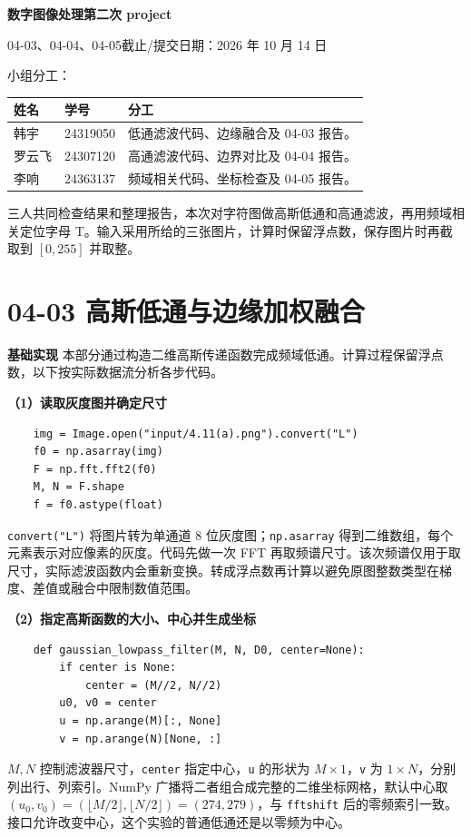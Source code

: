 \documentclass[UTF8,a4paper,zihao=5,fontset=fandol]{ctexart}
\begin{document}
\thispagestyle{plain}
\begin{center}
{\LARGE\bfseries 数字图像处理\quad 第二次 project}\par\vspace{5pt}
04-03、04-04、04-05\qquad 截止/提交日期：2026 年 10 月 14 日
\end{center}
\noindent 小组分工：
\begin{center}\small
\begin{tabularx}{\linewidth}{@{}llX@{}}\toprule
姓名 & 学号 & 分工\\\midrule
韩宇 & 24319050 & 低通滤波代码、边缘融合及 04-03 报告。\\
罗云飞 & 24307120 & 高通滤波代码、边界对比及 04-04 报告。\\
李响 & 24363137 & 频域相关代码、坐标检查及 04-05 报告。\\\bottomrule
\end{tabularx}
\end{center}
三人共同检查结果和整理报告，本次对字符图做高斯低通和高通滤波，再用频域相关定位字母 T。输入采用所给的三张图片，计算时保留浮点数，保存图片时再截取到 $[0,255]$ 并取整。

\section{04-03 高斯低通与边缘加权融合}
\textbf{基础实现}  本部分通过构造二维高斯传递函数完成频域低通。计算过程保留浮点数，以下按实际数据流分析各步代码。

\textbf{（1）读取灰度图并确定尺寸}
{\small
\begin{verbatim}
    img = Image.open("input/4.11(a).png").convert("L")
    f0 = np.asarray(img)
    F = np.fft.fft2(f0)
    M, N = F.shape
    f = f0.astype(float)
\end{verbatim}
}
\texttt{convert("L")} 将图片转为单通道 8 位灰度图；\texttt{np.asarray} 得到二维数组，每个元素表示对应像素的灰度。代码先做一次 FFT 再取频谱尺寸。该次频谱仅用于取尺寸，实际滤波函数内会重新变换。转成浮点数再计算以避免原图整数类型在梯度、差值或融合中限制数值范围。

\textbf{（2）指定高斯函数的大小、中心并生成坐标}
{\small
\begin{verbatim}
    def gaussian_lowpass_filter(M, N, D0, center=None):
        if center is None:
            center = (M//2, N//2)
        u0, v0 = center
        u = np.arange(M)[:, None]
        v = np.arange(N)[None, :]
\end{verbatim}
}
$M,N$ 控制滤波器尺寸，\texttt{center} 指定中心，\texttt{u} 的形状为 $M\times1$，\texttt{v} 为 $1\times N$，分别列出行、列索引。NumPy 广播将二者组合成完整的二维坐标网格，默认中心取 $(u_0,v_0)=(\lfloor M/2\rfloor,\lfloor N/2\rfloor)=(274,279)$，与 \texttt{fftshift} 后的零频索引一致。接口允许改变中心，这个实验的普通低通还是以零频为中心。
\end{document}
